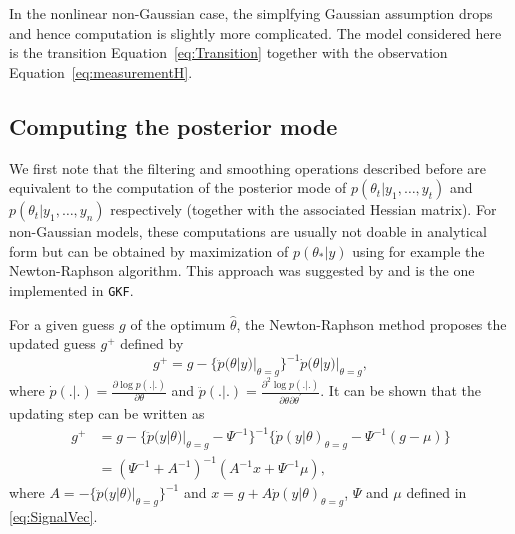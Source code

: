 \documentclass{article}
\newcommand{\GKF}{\texttt{GKF}\xspace}
\begin{document}
In the nonlinear non-Gaussian case, the simplfying Gaussian assumption drops and hence
computation is slightly more complicated. The model considered here is the transition
Equation~\eqref{eq:Transition} together with the observation
Equation~\eqref{eq:measurementH}.

\subsection{Computing the posterior mode}

We first note that the filtering and smoothing operations described before are equivalent to
the computation of the posterior mode of $p(\theta_t|y_1,\dots,y_t)$ and
$p(\theta_t|y_1,\dots,y_n)$ respectively (together with the associated Hessian matrix). For
non-Gaussian models, these computations are usually not doable in analytical form but can be
obtained by maximization of $p(\theta_*|y)$ using for example the Newton-Raphson
algorithm. This approach was suggested by \citet{jungbacker2007monte} and is the one
implemented in \GKF.

For a given guess $g$ of the optimum $\hat{\theta}$, the Newton-Raphson method proposes the
updated guess $g^+$ defined by
\begin{equation*}
  g^+ = g -\{ \ddot{p}(\theta|y)|_{\theta=g} \}^{-1} \dot{p}(\theta|y)|_{\theta=g}
  ,
\end{equation*}
where $ \dot{p} (.|.) = \frac{\partial \log p (.|.)}{ \partial \theta}$ and $ \ddot{p} (.|.) = \frac{\partial^2 \log p (.|.)}{ \partial \theta \partial \theta^{\prime}}$.
It can be shown that the updating step can be written as
\begin{align}
    g^+ &= g - \{\ddot{p}(y|\theta)|_{\theta=g} - \Psi^{-1}  \}^{-1} \{
          \dot{p}(y|\theta)_{\theta=g} - \Psi^{-1} (g- \mu) \} \nonumber \\
        &= (\Psi^{-1} + A^{-1})^{-1} (A^{-1} x + \Psi^{-1} \mu)
  ,
  \label{eq:NewtonStep}
\end{align}
where $ A = - \{\ddot{p}(y|\theta)|_{\theta=g} \}^{-1} $ and $x=g + A \dot{p}(y|\theta)_{\theta=g}$, $\Psi$ and $\mu$ defined in \eqref{eq:SignalVec}.
\end{document}
